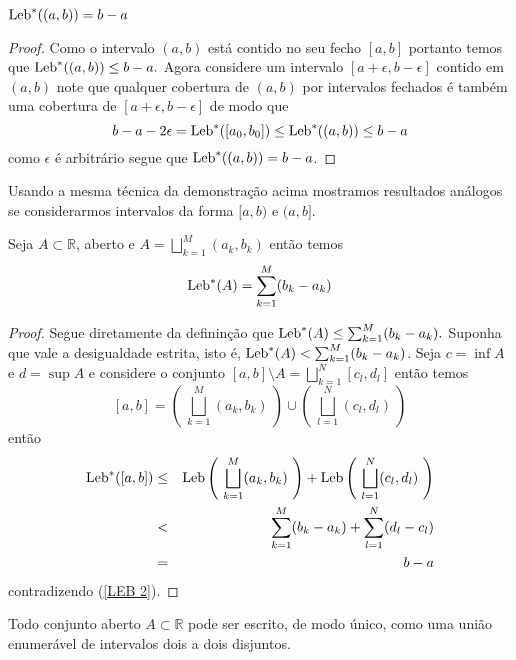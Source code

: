 \begin{lema}

$\textnormal{Leb}^{*}((a,b))=b-a$
\end{lema}


\begin{proof}
Como o intervalo $(a,b)$ está contido no seu fecho $[a,b]$ portanto temos que  $\textnormal{Leb}^{*}((a,b))\leq b-a.$ Agora considere um intervalo $[a+\epsilon,b-\epsilon]$ contido em $(a,b)$ note que qualquer cobertura de $(a,b)$ por intervalos fechados é também uma cobertura de $[a+\epsilon,b-\epsilon]$ de modo que 
$$
b-a-2\epsilon= \textnormal{Leb}^{*}([a_0,b_0])\leq  \textnormal{Leb}^{*}((a,b))\leq b-a
$$
como $\epsilon$ é arbitrário segue que  $\textnormal{Leb}^{*}((a,b))=b-a$.
\end{proof}
Usando a mesma técnica da demonstração acima mostramos resultados análogos se considerarmos intervalos  da forma $[a,b)$ e $(a,b]$.





\begin{lema}\label{LEB 3}
Seja $A\subset \mathbb{R}$,  aberto e $A=\bigsqcup_{k=1}^M(a_k,b_k)$ então temos 
$$
\textnormal{Leb}^{*}(A)=\sum_{k=1}^M(b_k-a_k)
$$
\end{lema}

\begin{proof}
Segue diretamente da defininção que $\textnormal{Leb}^{*}(A)\leq\sum_{k=1}^M(b_k-a_k).$ Suponha que vale a desigualdade estrita, isto é, $\textnormal{Leb}^{*}(A)<\sum_{k=1}^M(b_k-a_k)$. Seja $c=\inf A$ e $d=\sup A$
e considere o conjunto $[a,b]\setminus A=\bigsqcup_{k=1}^{N}[c_l,d_l]$ então temos
$$
[a,b]=\left(~\bigsqcup_{k=1}^M(a_k,b_k)~\right)\cup \left(~\bigsqcup_{l=1}^{N}(c_l,d_l)~\right)
$$
então 
\begin{eqnarray*}
\textnormal{Leb}^{*}([a,b])&\leq &\textnormal{Leb}\left(~\bigsqcup_{k=1}^M(a_k,b_k)~\right)+\textnormal{Leb}\left(~\bigsqcup_{l=1}^{N}(c_l,d_l)~\right)
\\
&
<
&
\sum_{k=1}^{M} (b_k-a_k)+\sum_{l=1}^N(d_l-c_l)
\\
&
=
&
b-a
\end{eqnarray*}
contradizendo (\ref{LEB 2}).

\end{proof}



\begin{proposicao}
Todo conjunto aberto $A\subset \mathbb{R}$ pode ser escrito, de modo único, como uma união enumerável de intervalos dois a dois disjuntos.
\end{proposicao}



